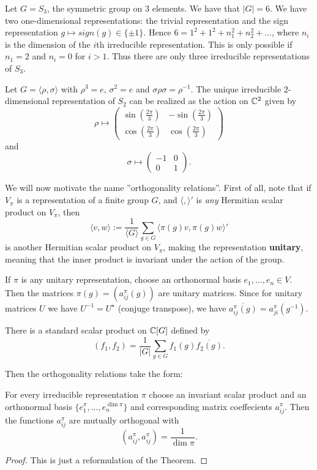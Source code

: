 \documentclass[11pt, english]{article}
\begin{document}
\begin{example}
Let $G=S_3$, the symmetric group on $3$ elements. We have that $\lvert G \rvert = 6$. We have two one-dimensional representations: the trivial representation and the sign representation $g \mapsto sign(g) \in \{ \pm 1 \}$. Hence $6=1^2+1^2+n_1^2+n_2^2+\ldots$, where $n_i$ is the dimension of the $i$th irreducible representation. This is only possible if $n_1=2$ and $n_i=0$ for $i >1$. Thus there are only three irreducible representations of $S_3$.

Let $G=\langle \rho, \sigma \rangle$ with $\rho^3=e$, $\sigma^2=e$ and $\sigma \rho \sigma = \rho^{-1}$. The unique irreducible $2$-dimensional representation of $S_2$ can be realized as the action on $\mathbb{C}^2$ given by 
$$
\rho \mapsto \begin{pmatrix}
\sin\left( \frac{2 \pi}{3} \right) & - \sin \left( \frac{2 \pi}{3} \right) \\
\cos \left( \frac{2\pi}{3} \right) & \cos \left( \frac{2 \pi}{3} \right)
\end{pmatrix}
$$
and 
$$
\sigma \mapsto \begin{pmatrix}
-1 & 0 \\
0 & 1 
\end{pmatrix}.
$$
\end{example}

We will now motivate the name ''orthogonality relations''. First of all, note that if $V_\pi$ is a representation of a finite group $G$, and $\langle,\rangle'$ is \emph{any} Hermitian scalar product on $V_\pi$, then 
$$
\langle v, w \rangle := \frac{1}{\langle G \rangle} \sum_{g \in G} \langle \pi(g) v, \pi(g) w \rangle'
$$
is another Hermitian scalar product on $V_\pi$, making the representation \textbf{unitary}, meaning that the inner product is invariant under the action of the group.

If $\pi$ is any unitary representation, choose an orthonormal basis $e_1,\ldots,e_n \in V$. Then the matrices $\pi(g) = \left( a_{ij}^\pi(g) \right)$ are unitary matrices. Since for unitary matrices $U$ we have $U^{-1}=U^\star$ (conjuge transpose), we have $\overline{a_{ij}^\pi(g)} = a_{ji}^\pi(g^{-1})$.

There is a standard scalar product on $\mathbb{C}[G]$ defined by
$$
(f_1,f_2) = \frac 1{\lvert G \rvert} \sum_{g \in G} f_1(g) \overline{f_2(g)}.
$$

Then the orthogonality relations take the form:

\begin{thm}
 For every irreducible representation $\pi$ choose an invariant scalar product and an orthonormal basis $\{e_1^\pi, \ldots, e_n^{\dim \pi}\}$ and corresponding matrix coeffecients $a_{ij}^\pi$. Then the functions $a_{ij}^\pi$ are mutually orthogonal with
$$
\left (a_{ij}^\pi, a_{ij}^\pi\right) = \frac{1}{\dim \pi}.
$$
\end{thm}
\begin{proof}
This is just a reformulation of the Theorem. 
\end{proof}
\end{document}
